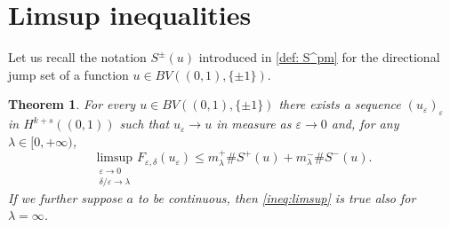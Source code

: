\documentclass{article}
\newtheorem{Theorem}{Theorem}[section]
\theoremstyle{definition}
\newcommand{\e}{\varepsilon}
\newcommand{\del}{\delta}
\def\e{\varepsilon}
\begin{document}
\section{Limsup inequalities}
Let us recall the notation $S^\pm(u)$ introduced in \eqref{def: S^pm} for the directional jump set of a function  $u \in BV((0,1), \{\pm 1\})$. 
\begin{Theorem}
    For every $u \in BV((0,1), \{\pm 1\})$ there exists a sequence $(u_\e)_{\e}$ in $H^{k+s}((0,1))$ such that $u_\e \to u$ in measure as $\e \to 0$ and, for any $\lambda\in [0,+\infty)$,
    \begin{equation}
    \label{ineq:limsup}
        \limsup_{\substack{\e\to 0 \\ \del/\e\to\lambda}} F_{\e,\del}(u_\e) \leq m^+_\lambda\#S^+(u) + m^-_\lambda\# S^-(u).
    \end{equation}
    If we further suppose $a$ to be continuous, then \eqref{ineq:limsup} is true also for $\lambda=\infty$.
\end{Theorem}
\end{document}
